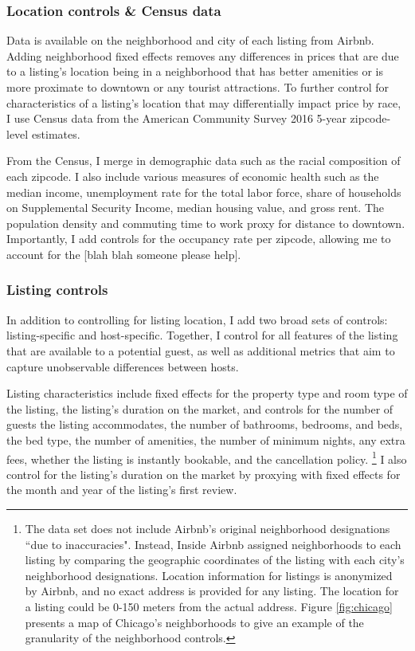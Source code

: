 \subsubsection*{Location controls \& Census data} 

Data is available on the neighborhood and city of each listing from Airbnb. Adding neighborhood fixed effects removes any differences in prices that are due to a listing's location being in a neighborhood that has better amenities or is more proximate to downtown or any tourist attractions. To further control for characteristics of a listing's location that may differentially impact price by race, I use Census data from the American Community Survey 2016 5-year zipcode-level estimates. 

From the Census, I merge in demographic data such as the racial composition of each zipcode. I also include various measures of economic health such as the median income, unemployment rate for the total labor force, share of households on Supplemental Security Income, median housing value, and gross rent. The population density and commuting time to work proxy for distance to downtown. Importantly, I add controls for the occupancy rate per zipcode, allowing me to account for the [blah blah someone please help]. 

\subsubsection*{Listing controls} 

In addition to controlling for listing location, I add two broad sets of controls: listing-specific and host-specific. Together, I control for all features of the listing that are available to a potential guest, as well as additional metrics that aim to capture unobservable differences between hosts. 

Listing characteristics include fixed effects for the property type and room type of the listing, the listing's duration on the market, and controls for the number of guests the listing accommodates, the number of bathrooms, bedrooms, and beds, the bed type, the number of amenities, the number of minimum nights, any extra fees, whether the listing is instantly bookable, and the cancellation policy.%
	\footnote{The data set does not include Airbnb's original neighborhood designations ``due to inaccuracies". Instead, Inside Airbnb assigned neighborhoods to each listing by comparing the geographic coordinates of the listing with each city's neighborhood designations. Location information for listings is anonymized by Airbnb, and no exact address is provided for any listing. The location for a listing could be 0-150 meters from the actual address. Figure \ref{fig:chicago} presents a map of Chicago's neighborhoods to give an example of the granularity of the neighborhood controls.}
I also control for the listing's duration on the market by proxying with fixed effects for the month and year of the listing's first review.


